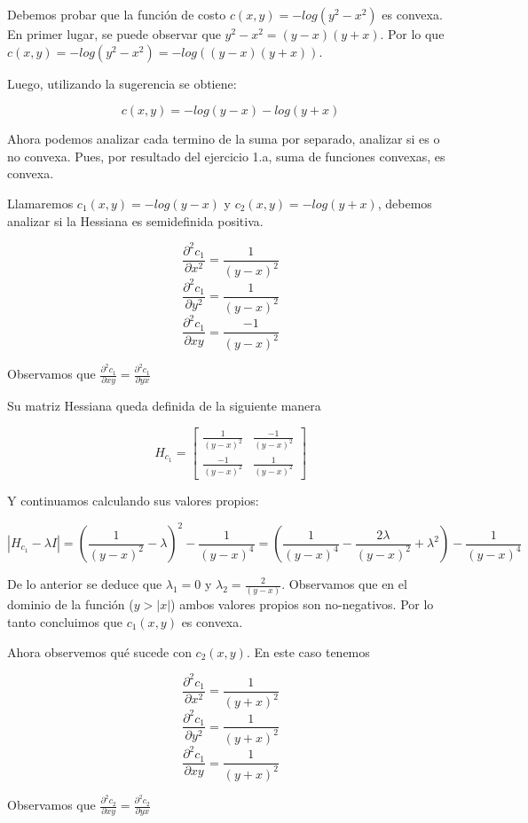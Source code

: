 \documentclass[10pt,a4paper]{report}
\begin{document}
	Debemos probar que la función de costo $c(x,y) = -log(y^2 - x^2)$ es convexa. \\
	
	En primer lugar, se puede observar que $y^2 - x^2 = (y-x)(y+x)$. Por lo que $c(x,y) = -log(y^2 - x^2) = -log((y-x)(y+x))$.
	
	Luego, utilizando la sugerencia se obtiene:
	
	$$c(x,y) = -log(y-x)-log(y+x)$$
	
	Ahora podemos analizar cada termino de la suma por separado, analizar si es o no convexa. Pues, por resultado del ejercicio 1.a, suma de funciones convexas, es convexa. 
	
	Llamaremos $c_1(x,y) = -log(y-x)$ y $c_2(x,y) = -log(y+x)$, debemos analizar si la Hessiana es semidefinida positiva. 
	
	$$\frac{\partial^2 c_1}{\partial x^2} = \frac{1}{(y-x)^2}$$
	$$\frac{\partial^2 c_1}{\partial y^2} = \frac{1}{(y-x)^2}$$
	$$\frac{\partial^2 c_1}{\partial xy} = \frac{-1}{(y-x)^2}$$
	
	Observamos que $\frac{\partial^2 c_1}{\partial xy} = \frac{\partial^2 c_1}{\partial yx}$
	
	Su matriz Hessiana queda definida de la siguiente manera
	
	\[ H_{c_1} = \begin{bmatrix}
		\frac{1}{(y-x)^2} & \frac{-1}{(y-x)^2}\\
		\frac{-1}{(y-x)^2} & \frac{1}{(y-x)^2}
	\end{bmatrix} \]
	
	Y continuamos calculando sus valores propios:
	
	$$|H_{c_1} - \lambda I| = (\frac{1}{(y-x)^2}-\lambda)^2 - \frac{1}{(y-x)^4} = (\frac{1}{(y-x)^4}-\frac{2\lambda }{(y-x)^2} + \lambda^2 ) - \frac{1}{(y-x)^4}$$
	
	De lo anterior se deduce que $\lambda_1 = 0$ y $\lambda_2 = \frac{2}{(y-x)}$. Observamos que en el dominio de la función ($y > |x|$) ambos valores propios son no-negativos. Por lo tanto concluimos que $c_1(x,y)$ es convexa.
	
	Ahora observemos qué sucede con $c_2(x,y)$. En este caso tenemos
	
	$$\frac{\partial^2 c_1}{\partial x^2} = \frac{1}{(y+x)^2}$$
	$$\frac{\partial^2 c_1}{\partial y^2} = \frac{1}{(y+x)^2}$$
	$$\frac{\partial^2 c_1}{\partial xy} = \frac{1}{(y+x)^2}$$
	
	Observamos que $\frac{\partial^2 c_2}{\partial xy} = \frac{\partial^2 c_2}{\partial yx}$
	
\end{document}

